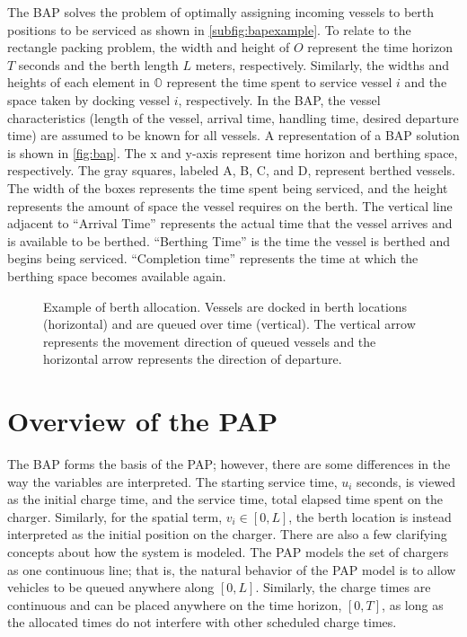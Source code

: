 \documentclass[ee,thesis]{usuthesis}
\begin{document}
The BAP solves the problem of optimally assigning incoming vessels to berth positions to be serviced as shown in
\autoref{subfig:bapexample}. To relate to the rectangle packing problem, the width and height of \(O\) represent the time
horizon \(T\) seconds and the berth length \(L\) meters, respectively. Similarly, the widths and heights of each element in
\(\mathbb{O}\) represent the time spent to service vessel \(i\) and the space taken by docking vessel \(i\), respectively. In
the BAP, the vessel characteristics (length of the vessel, arrival time, handling time, desired departure time) are
assumed to be known for all vessels. A representation of a BAP solution is shown in \autoref{fig:bap}. The x and y-axis
represent time horizon and berthing space, respectively. The gray squares, labeled A, B, C, and D, represent berthed
vessels. The width of the boxes represents the time spent being serviced, and the height represents the amount of space
the vessel requires on the berth. The vertical line adjacent to ``Arrival Time'' represents the actual time that the
vessel arrives and is available to be berthed. ``Berthing Time'' is the time the vessel is berthed and begins being
serviced. ``Completion time'' represents the time at which the berthing space becomes available again.

\begin{figure}[htpb]
\centering
    
    \caption{Example of berth allocation. Vessels are docked in berth locations (horizontal) and are queued over
      time (vertical). The vertical arrow represents the movement direction of queued vessels and the horizontal
      arrow represents the direction of departure.}
    \label{subfig:bapexample}
\end{figure}
\hfill

\section{Overview of the PAP}
\label{sec:overview-of-the-pap}
The BAP forms the basis of the PAP; however, there are some differences in the way the variables are interpreted. The
starting service time, \(u_i\) seconds, is viewed as the initial charge time, and the service time, total elapsed time
spent on the charger. Similarly, for the spatial term, \(v_i \in [0,L]\), the berth location is instead interpreted as the
initial position on the charger. There are also a few clarifying concepts about how the system is modeled. The PAP
models the set of chargers as one continuous line; that is, the natural behavior of the PAP model is to allow vehicles
to be queued anywhere along \([0,L]\). Similarly, the charge times are continuous and can be placed anywhere on the time
horizon, \([0,T]\), as long as the allocated times do not interfere with other scheduled charge times.
\end{document}
